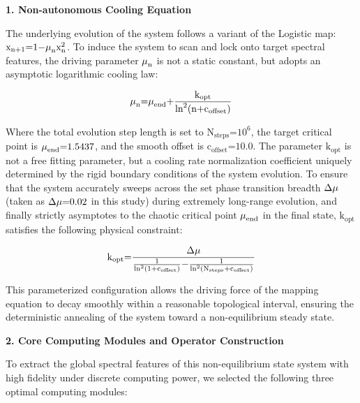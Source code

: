 \documentclass[fleqn,10pt]{wlscirep}
\begin{document}
\textbf{1. Non-autonomous Cooling Equation}

The underlying evolution of the system follows a variant of the Logistic
map:
\(\text{x}_{\text{n}\text{+1}}\text{=1\ensuremath{-}}\text{\ensuremath{\mu}}_{\text{n}}\text{x}_{\text{n}}^{\text{2}}\).
To induce the system to scan and lock onto target spectral features, the
driving parameter \(\text{\ensuremath{\mu}}_{\text{n}}\) is not a static constant, but
adopts an asymptotic logarithmic cooling law:

\[\text{\ensuremath{\mu}}_{\text{n}}\text{=}\text{\ensuremath{\mu}}_{\text{end}}\text{+}\frac{\text{k}_{\text{opt}}}{\text{ln}^{\text{2}}\text{(}\text{n}\text{+}\text{c}_{\text{offset}}\text{)}}\]

Where the total evolution step length is set to
\(\text{N}_{\text{steps}}\text{=}\text{10}^{\text{6}}\), the target
critical point is \(\text{\ensuremath{\mu}}_{\text{end}}\text{=1.5437}\), and the
smooth offset is \(\text{c}_{\text{offset}}\text{=10.0}\). The parameter
\(\text{k}_{\text{opt}}\) is not a free fitting parameter, but a cooling
rate normalization coefficient uniquely determined by the rigid boundary
conditions of the system evolution. To ensure that the system accurately
sweeps across the set phase transition breadth \(\text{\ensuremath{\Delta}}\text{\ensuremath{\mu}}\)
(taken as \(\text{\ensuremath{\Delta}}\text{\ensuremath{\mu}}\text{=0.02}\) in this study) during
extremely long-range evolution, and finally strictly asymptotes to the
chaotic critical point \(\text{\ensuremath{\mu}}_{\text{end}}\) in the final state,
\(\text{k}_{\text{opt}}\) satisfies the following physical constraint:

\[\text{k}_{\text{opt}}\text{=}\frac{\text{\ensuremath{\Delta}}\text{\ensuremath{\mu}}}{\frac{\text{1}}{\text{ln}^{\text{2}}\text{(1+}\text{c}_{\text{offset}}\text{)}}\text{\ensuremath{-}}\frac{\text{1}}{\text{ln}^{\text{2}}\text{(}\text{N}_{\text{steps}}\text{+}\text{c}_{\text{offset}}\text{)}}}\]

This parameterized configuration allows the driving force of the mapping
equation to decay smoothly within a reasonable topological interval,
ensuring the deterministic annealing of the system toward a
non-equilibrium steady state.

\textbf{2. Core Computing Modules and Operator Construction}

To extract the global spectral features of this non-equilibrium state
system with high fidelity under discrete computing power, we selected
the following three optimal computing modules:
\end{document}

